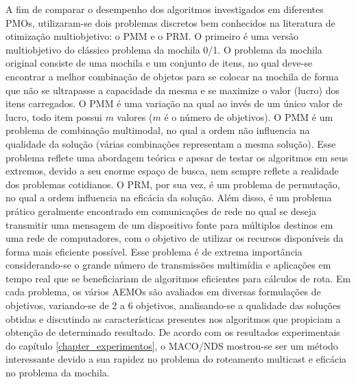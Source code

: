 A fim de comparar o desempenho dos algoritmos investigados em diferentes \acp{PMO}, utilizaram-se dois problemas discretos bem conhecidos na literatura de otimização multiobjetivo: o \ac{PMM} e o \ac{PRM}. O primeiro é uma versão multiobjetivo do clássico problema da mochila 0/1. O problema da mochila original consiste de uma mochila e um conjunto de itens, no qual deve-se encontrar a melhor combinação de objetos para se colocar na mochila de forma que não se ultrapasse a capacidade da mesma e se maximize o valor (lucro) dos itens carregados. O PMM é uma variação na qual ao invés de um único valor de lucro, todo item possui $m$ valores ($m$ é o número de objetivos). O \ac{PMM} é um problema de combinação multimodal, no qual a ordem não influencia na qualidade da solução (várias combinações representam a mesma solução). Esse problema reflete uma abordagem teórica e apesar de testar os algoritmos em seus extremos, devido a seu enorme espaço de busca, nem sempre reflete a realidade dos problemas cotidianos. O \ac{PRM}, por sua vez, é um problema de permutação, no qual a ordem influencia na eficácia da solução. Além disso, é um problema prático geralmente encontrado em comunicações de rede no qual se deseja transmitir uma mensagem de um dispositivo fonte para múltiplos destinos em uma rede de computadores, com o objetivo de utilizar os recursos disponíveis da forma mais eficiente possível. Esse problema é de extrema importância considerando-se o grande número de transmissões multimídia e aplicações em tempo real que se beneficiariam de algoritmos eficientes para cálculos de rota. Em cada problema, os vários AEMOs são avaliados em diversas formulações de objetivos, variando-se de 2 a 6 objetivos, analisando-se a qualidade das soluções obtidas e discutindo as características presentes nos algoritmos que propiciam a obtenção de determinado resultado. De acordo com os resultados experimentais do capítulo \ref{chapter_experimentos}, o MACO/NDS mostrou-se ser um método interessante devido a sua rapidez no problema do roteamento multicast e eficácia no problema da mochila. 

